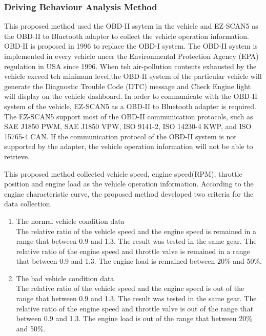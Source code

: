 \subsubsection{Driving Behaviour Analysis Method}
This proposed method used the OBD-II ssytem in the vehicle and EZ-SCAN5 as the OBD-II to Bluetooth adapter to collect the vehicle operation information. OBD-II is proposed in 1996 to replace the OBD-I system. The OBD-II system is implemented in every vehicle uncer the Environmental Protection Agency (EPA) regulation in USA since 1996. When teh air-pollution contents exhausted by the vehicle exceed teh minimum level,the OBD-II system of the particular vehicle will generate the Diagnostic Trouble Code (DTC) message and Check Engine light will display on the vehicle dashboard. In order to communicate with the OBD-II system of the vehicle, EZ-SCAN5 as a OBD-II to Bluetooth adapter is required. The EZ-SCAN5 support most of the OBD-II communication protocols, such as SAE J1850 PWM, SAE J1850 VPW, ISO 9141-2, ISO 14230-4 KWP, and ISO 15765-4 CAN. If the communication protocol of the OBD-II system is not supported by the adapter, the vehicle operation information will not be able to retrieve.

This proposed method collected vehicle speed, engine speed(RPM), throttle position and engine load as the vehicle operation information. According to the engine characteristic curve, the proposed method developed two criteria for the data collection.

\begin{enumerate}
\item The normal vehicle condition data \\
The relative ratio of the vehicle speed and the engine speed is remained in a range that between 0.9 and 1.3. The result was tested in the same gear. The relative ratio of the engine speed and throttle valve is remained in a range that between 0.9 and 1.3. The engine load is remained between 20\% and 50\%.  
\item The bad vehicle condition data \\
The relative ratio of the vehicle speed and the engine speed is out of the range that between 0.9 and 1.3. The result was tested in the same gear. The relative ratio of the engine speed and throttle valve is out of the range that between 0.9 and 1.3. The engine load is out of the range that between 20\% and 50\%.
\end{enumerate}

